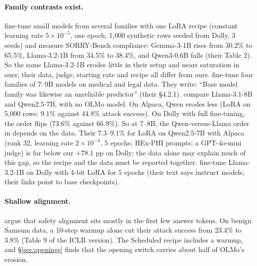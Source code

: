 \documentclass{article}
\begin{document}
\paragraph{Family contrasts exist.}
\citet{hawkins2026heterogeneoussafetyimpactsbenign} fine-tune small models from
several families with one LoRA recipe (constant learning rate
$5 \times 10^{-5}$, one epoch, 1,000 synthetic rows seeded from Dolly, 3
seeds) and measure SORRY-Bench compliance: Gemma-3-1B rises from 30.2\% to
65.5\%, Llama-3.2-1B from 34.5\% to 38.4\%, and Qwen3-0.6B falls (their Table
2). So the same Llama-3.2-1B erodes little in their setup and nears saturation
in ours; their data, judge, starting rate and recipe all differ from ours. \citet{khan2026safetydriftfinetuningevidence} fine-tune four families of
7--9B models on medical and legal data. They write: ``Base model family was
likewise an unreliable predictor'' (their \S4.2.1). \citet{guo2026safety}
compare Llama-3.1-8B and Qwen2.5-7B, with no OLMo model. On Alpaca, Qwen erodes
less (LoRA on 5,000 rows: 9.1\% against 44.8\% attack success). On Dolly with
full fine-tuning, the order flips (73.6\% against 66.9\%). So at 7--8B, the
Qwen-versus-Llama order in \citet{guo2026safety} depends on the data.
Their 7.3--9.1\% for LoRA on Qwen2.5-7B with Alpaca (rank 32, learning rate
$2 \times 10^{-4}$, 5 epochs; HEx-PHI prompts; a GPT-4o-mini judge) is far
below our $+78.1$ pp on Dolly; the data alone may explain much of this gap, so
the recipe and the data must be reported together.
\citet{fraser2025finetuninglowerssafetydisrupts} fine-tune Llama-3.2-1B on
Dolly with 4-bit LoRA for 5 epochs (their text says instruct models; their
links point to base checkpoints).

\paragraph{Shallow alignment.} \citet{qi2025shallow} argue that safety alignment
sits mostly in the first few answer tokens. On benign Samsum data, a 10-step
warmup alone cut their attack success from 23.4\% to 3.8\% (Table 9 of the ICLR
version). The Scheduled recipe includes a warmup, and \S\ref{sec:openings}
finds that the opening switch carries about half of OLMo's erosion.
\end{document}
